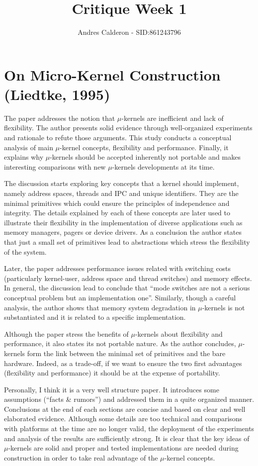 \documentclass[a4paper,10pt]{scrartcl}
\title{Critique Week 1}
\author{Andres Calderon - SID:861243796}
\begin{document}
\maketitle
\thispagestyle{empty}

\section*{On Micro-Kernel Construction (Liedtke, 1995)}
The paper addresses the notion that $\mu$-kernels are inefficient and lack of flexibility.  The author presents solid evidence through well-organized experiments and rationale to refute those arguments.  This study conducts a conceptual analysis of main $\mu$-kernel concepts, flexibility and performance.  Finally, it explains why $\mu$-kernels should be accepted inherently not portable and makes interesting comparisons with new $\mu$-kernels developments at its time.

The discussion starts exploring key concepts that a kernel should implement, namely address spaces, threads and IPC and unique identifiers.  They are the minimal primitives which could ensure the principles of independence and integrity.  The details explained by each of these concepts are later used to illustrate their flexibility in the implementation of diverse applications such as memory managers, pagers or device drivers. As a conclusion the author states that just a small set of primitives lead to abstractions which stress the flexibility of the system.

Later, the paper addresses performance issues related with switching costs (particularly kernel-user, address space and thread switches) and memory effects. In general, the discussion lead to conclude that ``mode switches are not a serious conceptual problem but an implementation one''. Similarly, though a careful analysis, the author shows that memory system degradation in $\mu$-kernels is not substantiated and it is related to a specific implementation.

Although the paper stress the benefits of $\mu$-kernels about flexibility and performance, it also states its not portable nature.  As the author concludes, $\mu$-kernels form the link between the minimal set of primitives and the bare hardware. Indeed, as a trade-off, if we want to ensure the two first advantages (flexibility and performance) it should be at the expense of portability. 

Personally, I think it is a very well structure paper.  It introduces some assumptions (``facts \& rumors'') and addressed them in a quite organized manner.  Conclusions at the end of each sections are concise and based on clear and well elaborated evidence. Although some details are too technical and comparisons with platforms at the time are no longer valid, the deployment of the experiments and analysis of the results are sufficiently strong.  It is clear that the key ideas of $\mu$-kernels are solid and proper and tested implementations are needed during construction in order to take real advantage of the $\mu$-kernel concepts.   

\end{document}
